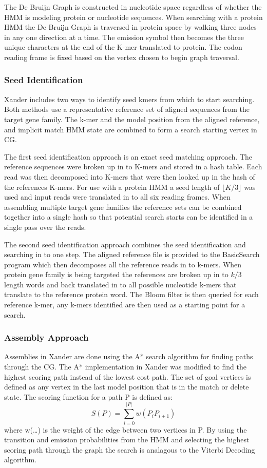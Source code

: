 \documentclass[10pt]{bmc_article}
\newenvironment{bmcformat}{\begin{raggedright}\baselineskip20pt\sloppy\setboolean{publ}{false}}{\end{raggedright}\baselineskip20pt\sloppy}
\begin{document}
\begin{bmcformat}
The De Bruijn Graph is constructed in nucleotide space regardless of whether the HMM is modeling protein or nucleotide sequences. When searching with a protein HMM the De Bruijn Graph is traversed in protein space by walking three nodes in any one direction at a time.  The emission symbol then becomes the three unique characters at the end of the K-mer translated to protein.  The codon reading frame is fixed based on the vertex chosen to begin graph traversal.

\subsubsection*{Seed Identification}
Xander includes two ways to identify seed kmers from which to start searching.  Both methods use a representative reference set of aligned sequences from the target gene family.  The k-mer and the model position from the aligned reference, and implicit match HMM state are combined to form a search starting vertex in CG.

The first seed identification approach is an exact seed matching approach. The reference sequences were broken up in to K-mers and stored in a hash table. Each read was then decomposed into K-mers that were then looked up in the hash of the references K-mers.  For use with a protein HMM a seed length of $\lfloor K/3\rfloor$ was used and input reads were translated in to all six reading frames. When assembling multiple target gene families the reference sets can be combined together into a single hash so that potential search starts can be identified in a single pass over the reads.

The second seed identification approach combines the seed identification and searching in to one step.  The aligned reference file is provided to the BasicSearch program which then decomposes all the reference reads in to k-mers.  When protein gene family is being targeted the references are broken up in to $k/3$ length words and back translated in to all possible nucleotide k-mers that translate to the reference protein word.  The Bloom filter is then queried for each reference k-mer, any k-mers identified are then used as a starting point for a search.  

\subsubsection*{Assembly Approach}
Assemblies in Xander are done using the A* search algorithm\cite{hart_formal_1968} for finding paths through the CG.  The A* implementation in Xander was  modified to find the highest scoring path instead of the lowest cost path. The set of goal vertices is defined as any vertex in the last model position that is in the match or delete state.  The scoring function for a path P is defined as: 
\[S(P) = \sum_{i=0}^{|P|}w(P_iP_{i+1})\] 
where w(\ldots) is the weight of the edge between two vertices in P.  By using the transition and emission probabilities from the HMM and selecting the highest scoring path through the graph the search is analagous to the Viterbi Decoding\cite{viterbi_error_1967} algorithm.


\end{bmcformat}
\end{document}
